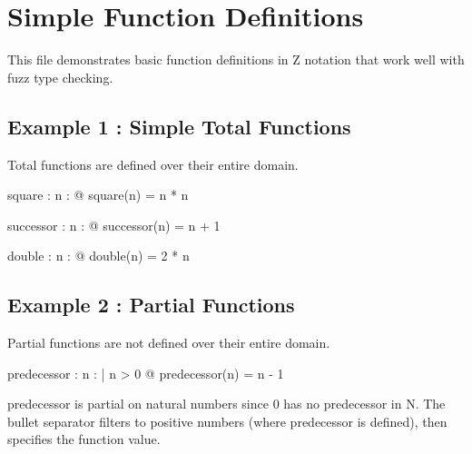 \documentclass[a4paper,10pt,fleqn]{article}
\begin{document}
\section*{Simple Function Definitions}

\noindent This file demonstrates basic function definitions in Z notation that work well with fuzz type checking.

\bigskip

\subsection*{Example 1 : Simple Total Functions}

\noindent Total functions are defined over their entire domain.

\bigskip

\begin{axdef}
square : \nat \fun \nat
\where
\forall n : \nat @ square(n) = n * n
\end{axdef}

\begin{axdef}
successor : \nat \fun \nat
\where
\forall n : \nat @ successor(n) = n + 1
\end{axdef}

\begin{axdef}
double : \nat \fun \nat
\where
\forall n : \nat @ double(n) = 2 * n
\end{axdef}

\subsection*{Example 2 : Partial Functions}

\noindent Partial functions are not defined over their entire domain.

\bigskip

\begin{axdef}
predecessor : \nat \pfun \nat
\where
\forall n : \nat | n > 0 @ predecessor(n) = n - 1
\end{axdef}

\noindent predecessor is partial on natural numbers since 0 has no predecessor in N. The bullet separator filters to positive numbers (where predecessor is defined), then specifies the function value.

\bigskip
\end{document}
